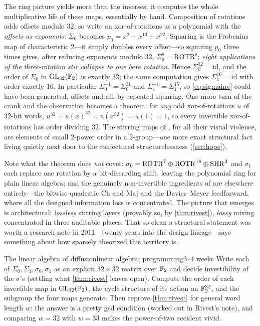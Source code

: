 The ring picture yields more than the inverses; it computes the whole
multiplicative life of these maps, essentially by hand. Composition of
rotations adds offsets modulo $32$, so write an xor-of-rotations as a
polynomial with the \emph{offsets as exponents}: $\Sigma_0$ becomes
$p_0 = x^{2} + x^{13} + x^{22}$. Squaring is the Frobenius map of
characteristic $2$---it simply doubles every offset---so squaring $p_0$
three times gives, after reducing exponents modulo $32$,
$\Sigma_0^{8} = \mathrm{ROTR}^{8}$: \emph{eight applications of the
three-rotation stir collapse to one bare rotation}. Hence
$\Sigma_0^{32} = \mathrm{id}$, and the order of $\Sigma_0$ in
$\mathrm{GL}_{32}(\mathbb{F}_2)$ is exactly $32$; the same computation gives
$\Sigma_1^{16} = \mathrm{id}$ with order exactly $16$. In particular
$\Sigma_0^{-1} = \Sigma_0^{31}$ and $\Sigma_1^{-1} = \Sigma_1^{15}$, so
\cref{eq:sigmainv} could have been generated, offsets and all, by
repeated squaring. One more turn of the crank and the observation
becomes a theorem: for \emph{any} odd xor-of-rotations $u$ of $32$-bit
words, $u^{32} = u(x)^{32} = u(x^{32}) = u(1) = 1$, so every invertible
xor-of-rotations has order dividing $32$. The stirring maps of \SHA{},
for all their visual violence, are elements of small $2$-power order in
a $2$-group---one more exact structural fact living quietly next door to
the conjectured structurelessness (\cref{sec:hope}).

Note what the theorem does \emph{not} cover: $\sigma_0 =
\mathrm{ROTR}^{7} \oplus \mathrm{ROTR}^{18} \oplus \mathrm{SHR}^{3}$
and $\sigma_1$ each replace one rotation by a bit-discarding shift,
leaving the polynomial ring for plain linear algebra; and the genuinely
non-invertible ingredients of \SHA{} are elsewhere entirely---the
bitwise-quadratic $\mathrm{Ch}$ and $\mathrm{Maj}$ and the Davies--Meyer
feedforward, where all the designed information loss is concentrated. The
picture that emerges is architectural: \emph{lossless} stirring layers
(provably so, by \cref{thm:rivest}), \emph{lossy} mixing concentrated in
three auditable places. That so clean a structural statement was worth a
research note in 2011---twenty years into the design lineage---says
something about how sparsely theorized this territory is.

\begin{project}{The linear algebra of diffusion}{linear algebra;
  programming}{3--4 weeks}
  Write each of $\Sigma_0, \Sigma_1, \sigma_0, \sigma_1$ as an explicit
  $32 \times 32$ matrix over $\mathbb{F}_2$ and decide invertibility of the
  $\sigma$'s (settling what \cref{thm:rivest} leaves open). Compute the
  order of each invertible map in $\mathrm{GL}_{32}(\mathbb{F}_2)$, the cycle
  structure of its action on $\mathbb{F}_2^{32}$, and the subgroup the four maps
  generate. Then reprove \cref{thm:rivest} for general word length $w$:
  the answer is a pretty gcd condition (worked out in Rivest's note), and
  comparing $w = 32$ with $w = 33$ makes the power-of-two accident vivid.
\end{project}

